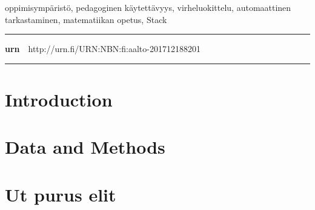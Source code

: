   \begin{spacing}{.88}
  {\parindent0pt %

  \parbox[t]{121.6mm}{\raggedright\small oppimisympäristö, pedagoginen käytettävyys, virheluokittelu, automaattinen tarkastaminen, matematiikan opetus, Stack}

  \vspace{.5mm}\rule{\textwidth}{.75pt}

  {\fontsize{10.5pt}{10.5pt}\bfseries\sffamily\lsstyle urn}~~{\small http://urn.fi/URN:NBN:fi:aalto-201712188201}

  \vspace{-2.4mm}\rule{\textwidth}{.75pt}

  } %
  \end{spacing}

  \restoregeometry  %




  \newpage

  \tableofcontents


  \newpage


  \chapter{Introduction}
  

  \chapter{Data and Methods}
  


  
  




  \appendix

  \chapter{Ut purus elit}

